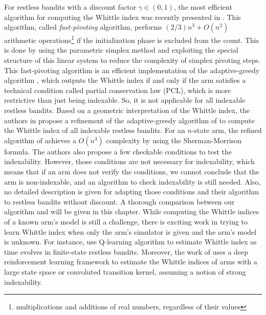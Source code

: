 For restless bandits with a discount factor $\gamma\in(0,1)$, the most efficient algorithm for computing the Whittle index was recently presented in \cite{nino2020fast}.
This algorithm, called \emph{fast-pivoting} algorithm, performs $(2/3)n^3+O(n^2)$ arithmetic operations\footnote{multiplications and additions of real numbers, regardless of their values} if the initialization phase is excluded from the count.
This is done by using the parametric simplex method and  exploiting the special structure of this linear system to reduce the complexity of simplex pivoting steps.
This fast-pivoting algorithm is an efficient implementation of the adaptive-greedy algorithm \cite{nino2007dynamic}, which outputs the Whittle index if and only if the arm satisfies a technical condition called partial conservation law (PCL), which is more restrictive than just being indexable.
So, it is not applicable for all indexable restless bandits.
Based on a geometric interpretation of the Whittle index, the authors in \cite{akbarzadeh2020conditions} propose a refinement of the adaptive-greedy algorithm of \cite{nino2007dynamic} to compute the Whittle index of all indexable restless bandits.
For an $n$-state arm, the refined algorithm of \cite{akbarzadeh2020conditions} achieves a $O(n^3)$ complexity by using the Sherman-Morrison formula.
The authors also propose a few checkable conditions to test the indexability.
However, those conditions are not necessary for indexability, which means that if an arm does not verify the conditions, we cannot conclude that the arm is non-indexable, and an algorithm to check indexability is still needed.
Also, no detailed description is given for adapting those conditions and their algorithm to restless bandits without discount.
A thorough comparison between our algorithm and \cite{akbarzadeh2020conditions,nino2020fast} will be given in this chapter. 
While computing the Whittle indices of a known arm's model is still a challenge, there is exciting work in trying to learn Whittle index when only the arm's simulator is given and the arm's model is unknown.
For instance, \cite{gibson2021novel, avrachenkov2022whittle, fu2019towards} use Q-learning algorithm to estimate Whittle index as time evolves in finite-state restless bandits. Moreover,
the work of \cite{nakhleh2021neurwin} uses a deep reinforcement learning framework to estimate the Whittle indices of arms with a large state space or convoluted transition kernel, assuming a notion of strong indexability. 


